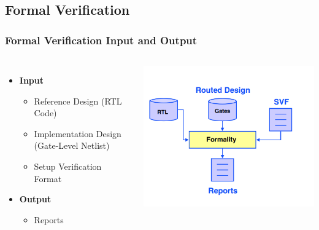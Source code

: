 \documentclass[compress]{beamer}
\begin{document}
\subsection[Formality]{Formal Verification}
\begin{frame}
	\frametitle{Formal Verification Input and Output}
	\begin{columns}	
		\begin{itemize}
			\item \textbf{Input}
			\begin{itemize}
				\item Reference Design (RTL Code) 
				\item Implementation Design (Gate-Level Netlist)
				\item Setup Verification Format
			\end{itemize}
			\item \textbf{Output}
			\begin{itemize}
				\item Reports
			\end{itemize}
		\end{itemize}
		\begin{center}
			\includegraphics[width=\textwidth]{Formal}
		\end{center}
	\end{columns}
\end{frame}
\end{document}
